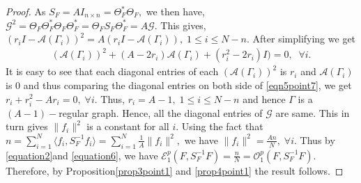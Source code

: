 \documentclass[10pt,a4paper]{amsart}
\begin{document}
\begin{proof}
	As $S_F = AI_{n\times n} = \Theta_{F}^* \Theta_F,$ we then have, $\mathcal{G}^2 = \Theta_F \Theta_{F}^{*} \Theta_F \Theta_{F}^{*} = \Theta_F S_F \Theta_{F}^* = A\mathcal{G}.$ This gives, $\left( r_{i} I -\mathcal{A}(\Gamma_i)    \right)^2 = A\left( r_{i} I -\mathcal{A}(\Gamma_i)    \right),\;1 \leq i \leq N-n.$ After simplifying we get 
	\begin{align}\label{eqn5point7}
		\left(\mathcal{A}(\Gamma_i)\right)^2 + (A- 2r_i)\mathcal{A}(\Gamma_i) + (r_{i}^2 - 2r_i)I) =0 , \;\;\forall i.
		\end{align} 
	 It is easy to see that each diagonal entries of each $\left(\mathcal{A}(\Gamma_i)\right)^2$ is $r_i$ and $\mathcal{A}(\Gamma_i)$ is $0$ and thus comparing the  diagonal entries on both side of \eqref{eqn5point7}, we get $r_{i} + r_{i}^2 - Ar_{i} =0,\; \forall i. $ Thus, $r_i = A -1,\; 1\leq i \leq N-n$ and hence $\Gamma$ is a $(A-1)-$regular graph. Hence, all the diagonal entries of $\mathcal{G}$ are same. This in turn gives $\|f_i\|^2$ is a constant for all $i.$ Using the fact that $n =\sum\limits_{i=1}^N \langle f_i,S_{F}^{-1}f_i \rangle = \sum\limits_{i=1}^N \frac{1}{A}\|f_i\|^2,$ we have $\|f_i\|^2 = \frac{An}{N},\; \forall i.$ Thus by \eqref{equation2}and \eqref{equation6}, we have $\mathcal{E}_{1}^p (F, S_{F}^{-1}F) = \frac{n}{N}= \mathcal{O}_{1}^p (F, S_{F}^{-1}F). $ Therefore, by Proposition\ref{prop3point1} and \ref{prop4point1} the result follows.
	
\end{proof}
\end{document}
